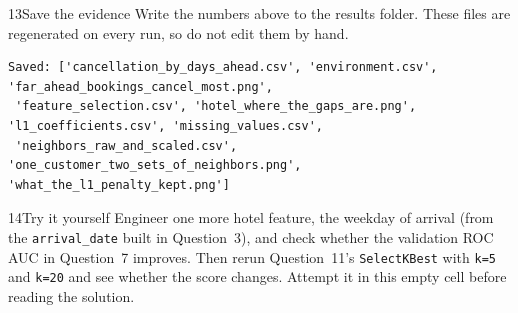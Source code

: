 \begin{labquestion}{13}{Save the evidence}
Write the numbers above to the results folder. These files are regenerated on every run, so do not edit them by hand.
\end{labquestion}
\begin{labanswer}

\begin{refoutput}
\begin{lstlisting}[style=utpterminal]
Saved: ['cancellation_by_days_ahead.csv', 'environment.csv', 'far_ahead_bookings_cancel_most.png',
 'feature_selection.csv', 'hotel_where_the_gaps_are.png', 'l1_coefficients.csv', 'missing_values.csv',
 'neighbors_raw_and_scaled.csv', 'one_customer_two_sets_of_neighbors.png', 'what_the_l1_penalty_kept.png']
\end{lstlisting}
\end{refoutput}
\end{labanswer}


\begin{labquestion}{14}{Try it yourself}
Engineer one more hotel feature, the weekday of arrival (from the \texttt{arrival\_date} built in Question~3), and check whether the validation ROC AUC in Question~7 improves. Then rerun Question~11's \texttt{SelectKBest} with \texttt{k=5} and \texttt{k=20} and see whether the score changes. Attempt it in this empty cell before reading the solution.
\end{labquestion}

